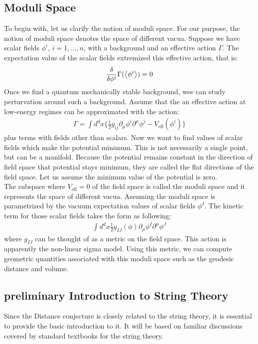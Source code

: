 \subsection{Moduli Space}
To begin with, let us clarify the notion of moduli space. For our purpose, the notion of moduli space denotes the space of different vacua. Suppose we have scalar fields $\phi ^{i}$, $i =1,\dotso ,n$, with a background and an effective action $\Gamma$. The expectation value of the scalar fields extremized this effective action, that is:
\begin{align}
    \fdv{\phi ^{i}} \Gamma (\expval{\phi ^{i}}) = 0
\end{align}
Once we find a quantum mechanically stable background, wee can study perturvation around such a background. Assume that the an effective action at low-energy regimes can be approximated with the action:
\begin{align}
    \Gamma = \int d^{d}x \lbrace \frac{1}{2} g_{ij} \partial _{\mu} \phi ^{i} \partial ^{\mu} \phi ^{j} - V_{\text{eff}} (\phi ^{i}) \rbrace
\end{align}
plus terms with fields other than scalars. Now we want to find values of scalar fields which make the potential minimum. This is not necessarily a single point, but can be a manifold. Because the potential remains constant in the direction of field space that potential stays minimum, they are called the flat directions of the field space. Let us assume the minimum value of the potential is zero. \\
\indent The subspace where $V_{\text{eff}} = 0$ of the field space is called the moduli space and it represents the space of different vacua. Assuming the moduli space is parametrized by the vacuum expectation values of scalar fields $\phi ^{I}$. The kinetic term for those scalar fields takes the form as following:
\begin{align}
    \int d^{d}x \frac{1}{2} g_{IJ} (\phi) \partial _{\mu} \phi ^{I} \partial ^{\mu} \phi ^{J}  
\end{align}
where $g_{IJ}$ can be thought of as a metric on the field space. This action is apparently the non-linear sigma model. Using this metric, we can compute geometric quantities associated with this moduli space such as the geodesic distance and volume.
\subsection{preliminary Introduction to String Theory}
Since the Distance conjecture is closely related to the string theory, it is essential to provide the basic introduction to it. It will be based on familiar discussions covered by standard textbooks for the string theory.

